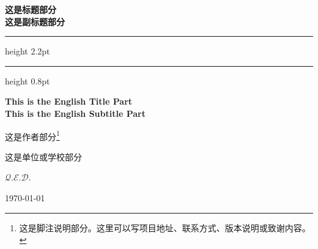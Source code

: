 \thispagestyle{empty}

\begin{center}

    {\fontsize{34pt}{40pt}\selectfont\rmfamily\bfseries\color{ThemeWine}
        这是标题部分\\[0.4em] 这是副标题部分
    }

    \vspace{1.2cm}

    {\color{ThemeWine}\hrule height 2.2pt}
    \vspace{2.5pt}
    {\color{ThemeRose}\hrule height 0.8pt}

    \vspace{1.2cm}

    {\fontsize{18pt}{22pt}\selectfont\rmfamily\bfseries\color{ThemeDarkBlue}
        This is the English Title Part
    } \\
    \vspace{0.6em}
    {\large\rmfamily\bfseries\color{ThemeDarkBlue} This is the English Subtitle Part}


    {\Large\kaishu\color{ThemeDarkBlue} 这是作者部分}\footnote{%
        \color{ThemeDarkBlue}\rmfamily
        这是脚注说明部分。这里可以写项目地址、联系方式、版本说明或致谢内容。
    }

    \vspace{0.5cm}
    {\large\kaishu\color{ThemeMidBlue} 这是单位或学校部分}

    \vspace{2cm}

    {\color{ThemeRose}\Large $\mathcal{Q.E.D.}$}

    \vspace{0.8cm}
    {\large\rmfamily\color{ThemeMidBlue}\today}

\end{center}

\newpage
\thispagestyle{empty}

\endinput
